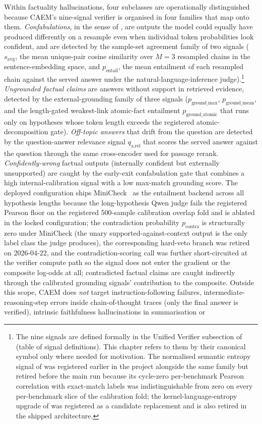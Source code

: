 Within factuality hallucinations, four subclasses are operationally distinguished because CAEM's nine-signal verifier is organised in four families that map onto them. \textit{Confabulations}, in the sense of \cite{farquhar2024semantic}, are outputs the model could equally have produced differently on a resample even when individual token probabilities look confident, and are detected by the sample-set agreement family of two signals ($s_{\text{avg}}$, the mean unique-pair cosine similarity over $M{=}3$ resampled chains in the sentence-embedding space, and $p_{\text{entail}}$, the mean entailment of each resampled chain against the served answer under the natural-language-inference judge).\footnote{The nine signals are defined formally in the Unified Verifier subsection of  (table of signal definitions). This chapter refers to them by their canonical symbol only where needed for motivation. The normalised semantic entropy signal of \cite{farquhar2024semantic} was registered earlier in the project alongside the same family but retired before the main run because its cycle-zero per-benchmark Pearson correlation with exact-match labels was indistinguishable from zero on every per-benchmark slice of the calibration fold; the kernel-language-entropy upgrade of \cite{nikitin2024kle} was registered as a candidate replacement and is also retired in the shipped architecture.} \textit{Ungrounded factual claims} are answers without support in retrieved evidence, detected by the external-grounding family of three signals ($p_{\text{ground\_max}}$, $p_{\text{ground\_mean}}$, and the length-gated weakest-link atomic-fact entailment $p_{\text{ground\_atomic}}$ that runs only on hypotheses whose token length exceeds the registered atomic-decomposition gate). \textit{Off-topic answers} that drift from the question are detected by the question-answer relevance signal $q_{\text{a,rel}}$ that scores the served answer against the question through the same cross-encoder used for passage rerank. \textit{Confidently-wrong} factual outputs (internally confident but externally unsupported) are caught by the early-exit confabulation gate that combines a high internal-calibration signal with a low max-match grounding score. The deployed configuration ships MiniCheck~\cite{tang2024minicheck} as the entailment backend across all hypothesis lengths because the long-hypothesis Qwen judge fails the registered Pearson floor on the registered 500-sample calibration overlap fold and is ablated in the locked configuration; the contradiction probability $p_{\text{contra}}$ is structurally zero under MiniCheck (the unary supported-against-context output is the only label class the judge produces), the corresponding hard-veto branch was retired on 2026-04-22, and the contradiction-scoring call was further short-circuited at the verifier compute path so the signal does not enter the gradient or the composite log-odds at all; contradicted factual claims are caught indirectly through the calibrated grounding signals' contribution to the composite. Outside this scope, CAEM does \textit{not} target instruction-following failures, intermediate-reasoning-step errors inside chain-of-thought traces (only the final answer is verified), intrinsic faithfulness hallucinations in summarisation or 